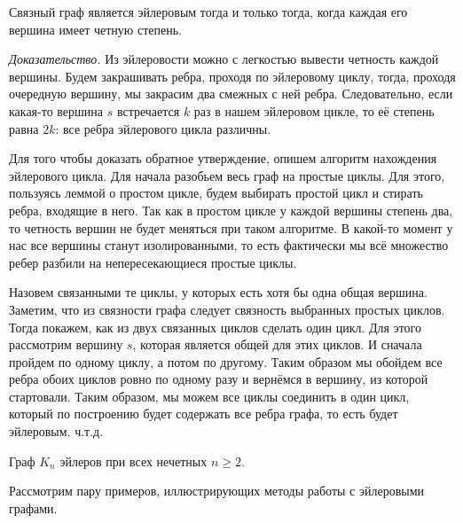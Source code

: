 \begin{theorem}
	Связный граф является эйлеровым тогда и только тогда, когда каждая его вершина имеет четную степень.
	
	\emph{Доказательство.} Из эйлеровости можно с легкостью вывести четность каждой вершины. Будем закрашивать ребра, проходя по эйлеровому циклу, тогда, проходя очередную вершину, мы закрасим два смежных с ней ребра. Следовательно, если какая-то вершина $s$ встречается $k$ раз в нашем эйлеровом цикле, то её степень равна $2k$: все ребра эйлерового цикла различны.
	
	Для того чтобы доказать обратное утверждение, опишем алгоритм нахождения эйлерового цикла. Для начала разобьем весь граф на простые циклы. Для этого, пользуясь леммой о простом цикле, будем выбирать простой цикл и стирать ребра, входящие в него. Так как в простом цикле у каждой вершины степень два, то четность вершин не будет меняться при таком алгоритме. В какой-то момент у нас все вершины станут изолированными, то есть фактически мы всё множество ребер разбили на непересекающиеся простые циклы.
	
	Назовем связанными те циклы, у которых есть хотя бы одна общая вершина. Заметим, что из связности графа следует связность выбранных простых циклов. Тогда покажем, как из двух связанных циклов сделать один цикл. Для этого рассмотрим вершину $s$, которая является общей для этих циклов. И сначала пройдем по одному циклу, а потом по другому. Таким образом мы обойдем все ребра обоих циклов ровно по одному разу и вернёмся в вершину, из которой стартовали. Таким образом, мы можем все циклы соединить в один цикл, который по построению будет содержать все ребра графа, то есть будет эйлеровым. ч.т.д.
\end{theorem}
	
\begin{consequence}
	Граф $K_n$ эйлеров при всех нечетных $n \geqslant 2$.
\end{consequence}

	Рассмотрим пару примеров, иллюстрирующих методы работы с эйлеровыми графами.

